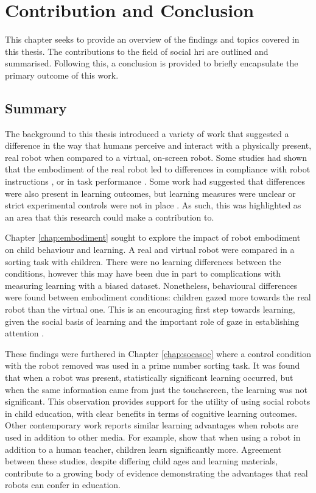 \chapter{Contribution and Conclusion} \label{chap:conclusion}
This chapter seeks to provide an overview of the findings and topics covered in this thesis. The contributions to the field of social \acrshort{hri} are outlined and summarised. Following this, a conclusion is provided to briefly encapsulate the primary outcome of this work.

\section{Summary}\label{sec:conc-summary}
The background to this thesis introduced a variety of work that suggested a difference in the way that humans perceive and interact with a physically present, real robot when compared to a virtual, on-screen robot. Some studies had shown that the embodiment of the real robot led to differences in compliance with robot instructions \citep{bainbridge2008effect}, or in task performance \citep{leyzberg2012physical}. Some work had suggested that differences were also present in \gls{learning} outcomes, but \gls{learning} measures were unclear or strict experimental controls were not in place \citep{han2008comparative}. As such, this was highlighted as an area that this research could make a contribution to.

Chapter \ref{chap:embodiment} sought to explore the impact of robot embodiment on child behaviour and \gls{learning}. A real and virtual robot were compared in a sorting task with children. There were no \gls{learning} differences between the conditions, however this may have been due in part to complications with measuring \gls{learning} with a biased dataset. Nonetheless, behavioural differences were found between embodiment conditions: children gazed more towards the real robot than the virtual one. This is an encouraging first step towards \gls{learning}, given the social basis of \gls{learning} \citep{kuhl2007speech} and the important role of gaze in establishing attention \citep{wu2010social}.

These findings were furthered in Chapter \ref{chap:socasoc} where a control condition with the robot removed was used in a prime number sorting task. It was found that when a robot was present, statistically significant \gls{learning} occurred, but when the same information came from just the touchscreen, the \gls{learning} was not significant. This observation provides support for the utility of using social robots in child education, with clear benefits in terms of cognitive \gls{learning} outcomes. Other contemporary work reports similar \gls{learning} advantages when robots are used in addition to other media. For example, \cite{alemi2014employing} show that when using a robot in addition to a human teacher, children learn significantly more. Agreement between these studies, despite differing child ages and learning materials, contribute to a growing body of evidence demonstrating the advantages that real robots can confer in education.

